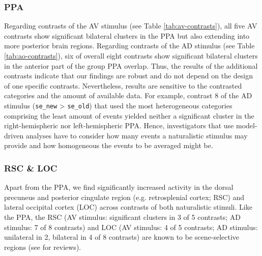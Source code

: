 \documentclass[english]{article}
\begin{document}
\subsubsection{PPA}

Regarding contrasts of the AV stimulus (see Table \ref{tab:av-contrasts}), all
five AV contrasts show significant bilateral clusters in the PPA but also
extending into more posterior brain regions.
Regarding contrasts of the AD stimulus (see Table \ref{tab:ao-contrasts}), six
of overall eight contrasts show significant bilateral clusters in the anterior
part of the group PPA overlap.
Thus, the results of the additional contrasts indicate that our findings are
robust and do not depend on the design of one specific contrasts.
Nevertheless, results are sensitive to the contrasted categories and the amount
of available data.
For example, contrast 8 of the AD stimulus (\texttt{se\_new} > \texttt{se\_old})
that used the most heterogeneous categories comprising the least amount of
events yielded neither a significant cluster in the right-hemispheric nor
left-hemispheric PPA.
Hence, investigators that use model-driven analyses have to consider how many
events a naturalistic stimulus may provide and how homogeneous the events to be
averaged might be.


\subsubsection{RSC \& LOC}


Apart from the PPA, we find significantly increased activity in the dorsal
precuneus and posterior cingulate region (e.g. retrosplenial cortex; RSC) and
lateral occipital cortex (LOC) across contrasts of both naturalistic stimuli.
Like the PPA, the RSC (AV stimulus: significant clusters in 3 of 5 contrasts; AD
stimulus: 7 of 8 contrasts) and LOC (AV stimulus: 4 of 5 contrasts; AD stimulus:
unilateral in 2, bilateral in 4 of 8 contrasts) are known to be scene-selective
regions (see \citep{chrastil2018heterogeneity, bettencourt2013role} for
reviews).
\end{document}
